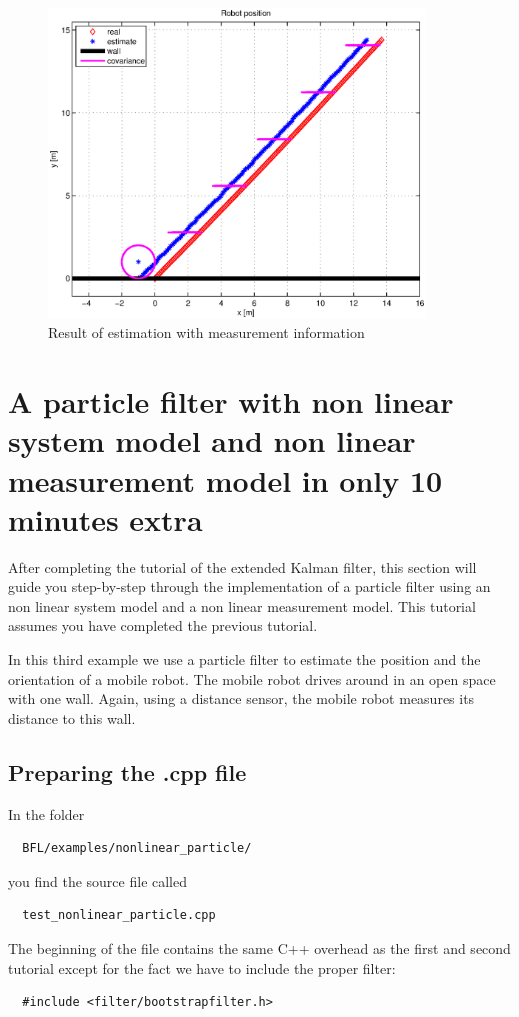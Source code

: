 \documentclass[a4paper,10pt]{report}
\begin{document}
\begin{figure}
\center
\includegraphics[width=10cm]{robot_nonlinearkalman_meas.eps}
\caption{Result of estimation with measurement information}
\label{fig: nonlinear_kalman_meas}
\end{figure}










\pagebreak
\section{A particle filter with non linear system model and non linear
  measurement model in only 10 minutes extra}
After completing the tutorial of the extended Kalman filter, this
section will guide you step-by-step through the implementation of a
particle filter using an non linear system model and a non linear
measurement model. This tutorial assumes you have completed the
previous tutorial.

In this third example we use a particle filter to estimate the
position and the orientation of a mobile robot. The mobile robot
drives around in an open space with one wall. Again, using a distance
sensor, the mobile robot measures its distance to this wall.

\subsection{Preparing the .cpp file}
In the folder 
\begin{verbatim}
  BFL/examples/nonlinear_particle/
\end{verbatim}
you find the source file called 
\begin{verbatim}
  test_nonlinear_particle.cpp
\end{verbatim}
The beginning of the file contains the same C++ overhead as the first
and second tutorial except for the fact we have to include the proper
filter:
\begin{verbatim}
  #include <filter/bootstrapfilter.h>
\end{verbatim}
\end{document}
